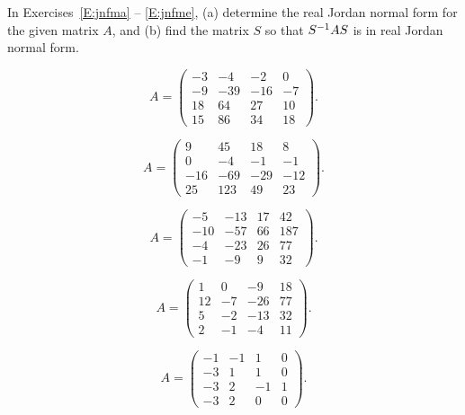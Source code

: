 \documentclass{ximera}
\begin{document}
\noindent In Exercises~\ref{E:jnfma} -- \ref{E:jnfme}, (a) determine the real
Jordan normal form for the given matrix $A$, and (b) find the matrix $S$ so 
that $S^{-1} AS$ is in real Jordan normal form.  
\begin{exercise}  \label{E:jnfma}
\begin{equation*}
A = \left(\begin{array}{rrrr} -3 & -4 & -2 & 0\\
-9 & -39 & -16 & -7\\ 18 & 64 & 27 & 10 \\ 15 & 86 & 34 & 18
\end{array}\right). 
\end{equation*}
\end{exercise}
\begin{exercise}  \label{E:jnfmb}
\begin{equation*}
A =\left(\begin{array}{rrrr} 9 & 45 & 18 & 8\\
0 & -4 & -1 & -1\\ -16 & -69 & -29 & -12 \\ 25 & 123 & 49 & 23
\end{array}\right). 
\end{equation*}
\end{exercise}
\begin{exercise}  \label{E:jnfmc}
\begin{equation*}
A = \left(\begin{array}{rrrr} -5 & -13 & 17 & 42\\
-10 & -57 & 66 & 187\\ -4 & -23 & 26 & 77 \\ -1 & -9 & 9 & 32
\end{array}\right).  
\end{equation*}
\end{exercise}
\begin{exercise}  \label{E:jnfmd}
\begin{equation*}
A = \left(\begin{array}{rrrr} 1 & 0 & -9 & 18 \\
12 & -7 & -26 & 77\\ 5 & -2 & -13 & 32 \\ 2 & -1 & -4 & 11
\end{array}\right). 
\end{equation*}
\end{exercise}
\begin{exercise} \label{E:jnfme}
\begin{equation*}
A = \left(\begin{array}{rrrr} 
    -1  &  -1  &   1   &  0\\
    -3  &   1  &   1   &  0\\
    -3  &   2  &  -1   &  1\\
    -3  &   2  &   0   &  0
 \end{array}\right). 
\end{equation*}
\end{exercise}
\end{document}
